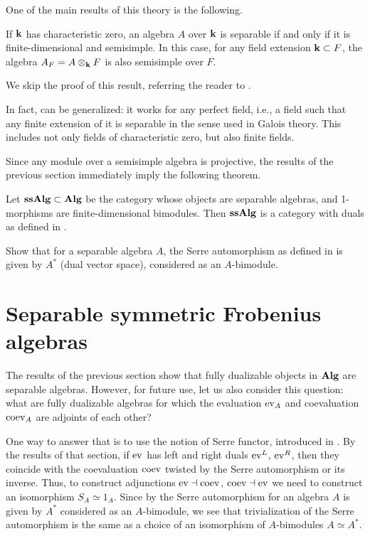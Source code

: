 One of the main results of this theory is the following.
\begin{theorem}\label{t:separable-ss}
  If $\mathbf{k}$ has characteristic zero, an algebra $A$ over $\mathbf{k}$ is
  separable if and only if it is finite-dimensional and semisimple.
  In this case, for any field extension $\mathbf{k}\subset F$, the algebra
  $A_F=A\otimes_{\mathbf{k}} F$ is also semisimple over $F$.
\end{theorem}
We skip the proof of this result, referring the reader to
\cite[Section 10.7]{pierce}.

\begin{remark}
  In fact,  can be generalized: it works for any perfect
  field, i.e., a field such that any finite extension of it is separable in the
  sense used in Galois theory. This includes not only fields of characteristic
  zero, but also finite fields.
\end{remark}




Since any module over a semisimple algebra is projective,
the results of the previous section immediately imply the following theorem.
\begin{theorem}\label{t:ssalg}
  Let $\mathbf{ssAlg}\subset \mathbf{Alg}$ be the category whose objects are separable
  algebras, and 1-morphisms are finite-dimensional
  bimodules. Then $\mathbf{ssAlg}$ is a category with duals as defined in
  .
\end{theorem}

\begin{exercise}\label{ec:serre-separable}
  Show that for a separable algebra $A$, the Serre automorphism as defined in
   is given by $A^*$ (dual vector space), considered as
  an $A$-bimodule.
\end{exercise}




\section{Separable symmetric Frobenius algebras}\label{s:ssfrob}
The results of the previous section show that fully dualizable objects in $\mathbf{Alg}$ are
separable algebras. However, for future use, let us also consider this question:
what are fully dualizable algebras for which the evaluation $\operatorname{ev}_A$ and
coevaluation $\operatorname{coev}_A$ are adjoints of each other?


One way to answer that is to use the notion of Serre functor, introduced in
. By the results of that section, if $\operatorname{ev}$ has left and right
duals $\operatorname{ev}^L$, $\operatorname{ev}^R$, then they coincide with the coevaluation $\operatorname{coev}$ twisted
by the Serre automorphism or its inverse. Thus, to construct adjunctions
$\operatorname{ev}\dashv\operatorname{coev}$, $\operatorname{coev}\dashv\operatorname{ev}$ we need to construct an isomorphism
$S_A\simeq 1_A$. Since by  the Serre automorphism for
an algebra $A$ is given by $A^*$ considered as an $A$-bimodule, we see that
trivialization of the Serre automorphism is the same as a choice of an
isomorphism of $A$-bimodules $A\simeq A^*$.

